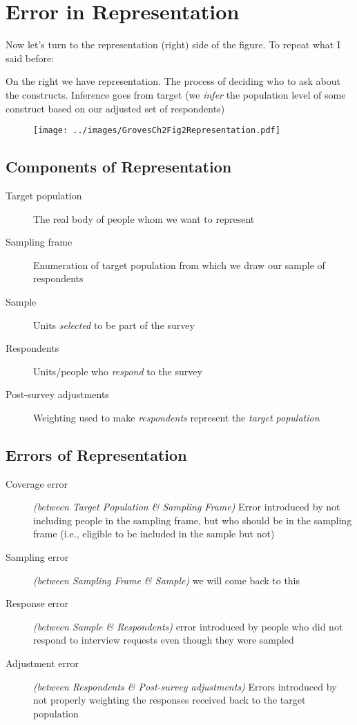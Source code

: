 \documentclass[11pt]{lecturenotes}
\begin{document}
\clearpage

\section{Error in Representation}
\slide
Now let's turn to the representation (right) side of the figure. To repeat what I said before: 

On the right we have representation. The process of deciding who to ask about the constructs. Inference goes from target (we \emph{infer} the population level of some construct based on our adjusted set of respondents)


\begin{figure}[h!]
\begin{center}
\texttt{[image: ../images/GrovesCh2Fig2Representation.pdf]}
\end{center}
\end{figure}

\subsection[5]{Components of Representation}
\slide
\begin{description}
\item[Target population] The real body of people whom we want to represent
\item[Sampling frame] Enumeration of target population from which we draw our sample of respondents
\item[Sample] Units \emph{selected} to be part of the survey
\item[Respondents] Units\slash people who \emph{respond} to the survey
\item[Post-survey adjustments] Weighting used to make \emph{respondents} represent the \emph{target population}
\end{description}

\subsection[10]{Errors of Representation}
\slide
\begin{description}
\item[Coverage error] \textit{(between Target Population \& Sampling Frame)} Error introduced by not including people in the sampling frame, but who should be in the sampling frame (i.e., eligible to be included in the sample but not)
\item[Sampling error] \textit{(between Sampling Frame \& Sample)} we will come back to this
\item[Response error] \textit{(between Sample \& Respondents)} error introduced by people who did not respond to interview requests even though they were sampled
\item[Adjustment error] \textit{(between Respondents \& Post-survey adjustments)} Errors introduced by not properly weighting the responses received back to the target population
\end{description}
\end{document}

